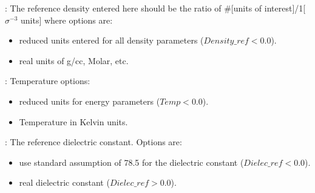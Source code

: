 \documentclass[10pt,onecolumn]{article}
\begin{document}
\vspace{0.1in}
: The reference density entered here should be the ratio of
\#[units of interest]/1[$\sigma^{-3}$ units] where options are:
\begin{itemize}
\item{reduced units entered for all density parameters ($Density\_ref<0.0$).}
\item{real units of g/cc, Molar, etc.}
\end{itemize}

\vspace{0.1in}
: Temperature options:
\begin{itemize}
\item{reduced units for energy parameters ($Temp<0.0$).}
\item{Temperature in Kelvin units.}
\end{itemize}

\vspace{0.1in}
: The reference dielectric constant. Options are:
\begin{itemize}
\item{use standard assumption of 78.5 for the dielectric constant ($Dielec\_ref<0.0$).}
\item{real dielectric constant ($Dielec\_ref>0.0$).}
\end{itemize}
\end{document}
